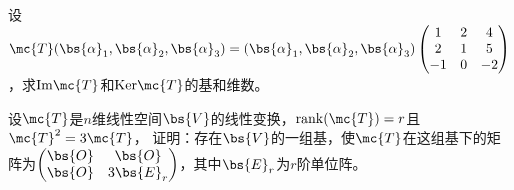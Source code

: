 \documentclass[12pt, a4paper, oneside, UTF8]{ctexbook}
\begin{document}
\begin{question}
    设$\mc{T}(\bs{\alpha}_1,\bs{\alpha}_2,\bs{\alpha}_3)=(\bs{\alpha}_1,\bs{\alpha}_2,\bs{\alpha}_3)
    \begin{pmatrix}
        1&2&4\\
        2&1&5\\
        -1&0&-2
    \end{pmatrix}$，求$\mathrm{Im}\mc{T}$和$\mathrm{Ker}\mc{T}$的基和维数。
\end{question}

\begin{question}
    设$\mc{T}$是$n$维线性空间$\bs{V}$的线性变换，$\mathrm{rank}(\mc{T})=r$且$\mc{T}^2=3\mc{T}$，
    证明：存在$\bs{V}$的一组基，使$\mc{T}$在这组基下的矩阵为$\begin{pmatrix}
        \bs{O} &\bs{O}\\
        \bs{O} &3\bs{E}_r
    \end{pmatrix}$，其中$\bs{E}_r$为$r$阶单位阵。
\end{question}

\ifx\allfiles\undefined
\end{document}
